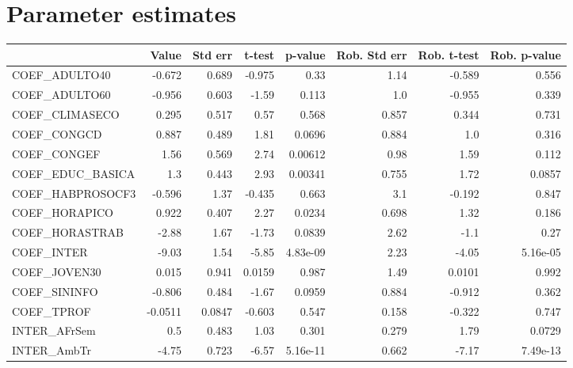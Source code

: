 \section{Parameter estimates}
\begin{tabular}{lrrrrrrr}
\toprule
{} &   Value &  Std err &  t-test &  p-value &  Rob. Std err &  Rob. t-test &  Rob. p-value \\
\midrule
COEF\_ADULTO40       &  -0.672 &    0.689 &  -0.975 &     0.33 &          1.14 &       -0.589 &         0.556 \\
COEF\_ADULTO60       &  -0.956 &    0.603 &   -1.59 &    0.113 &           1.0 &       -0.955 &         0.339 \\
COEF\_CLIMASECO      &   0.295 &    0.517 &    0.57 &    0.568 &         0.857 &        0.344 &         0.731 \\
COEF\_CONGCD         &   0.887 &    0.489 &    1.81 &   0.0696 &         0.884 &          1.0 &         0.316 \\
COEF\_CONGEF         &    1.56 &    0.569 &    2.74 &  0.00612 &          0.98 &         1.59 &         0.112 \\
COEF\_EDUC\_BASICA    &     1.3 &    0.443 &    2.93 &  0.00341 &         0.755 &         1.72 &        0.0857 \\
COEF\_HABPROSOCF3    &  -0.596 &     1.37 &  -0.435 &    0.663 &           3.1 &       -0.192 &         0.847 \\
COEF\_HORAPICO       &   0.922 &    0.407 &    2.27 &   0.0234 &         0.698 &         1.32 &         0.186 \\
COEF\_HORASTRAB      &   -2.88 &     1.67 &   -1.73 &   0.0839 &          2.62 &         -1.1 &          0.27 \\
COEF\_INTER          &   -9.03 &     1.54 &   -5.85 & 4.83e-09 &          2.23 &        -4.05 &      5.16e-05 \\
COEF\_JOVEN30        &   0.015 &    0.941 &  0.0159 &    0.987 &          1.49 &       0.0101 &         0.992 \\
COEF\_SININFO        &  -0.806 &    0.484 &   -1.67 &   0.0959 &         0.884 &       -0.912 &         0.362 \\
COEF\_TPROF          & -0.0511 &   0.0847 &  -0.603 &    0.547 &         0.158 &       -0.322 &         0.747 \\
INTER\_AFrSem        &     0.5 &    0.483 &    1.03 &    0.301 &         0.279 &         1.79 &        0.0729 \\
INTER\_AmbTr         &   -4.75 &    0.723 &   -6.57 & 5.16e-11 &         0.662 &        -7.17 &      7.49e-13 \\

\end{tabular}
